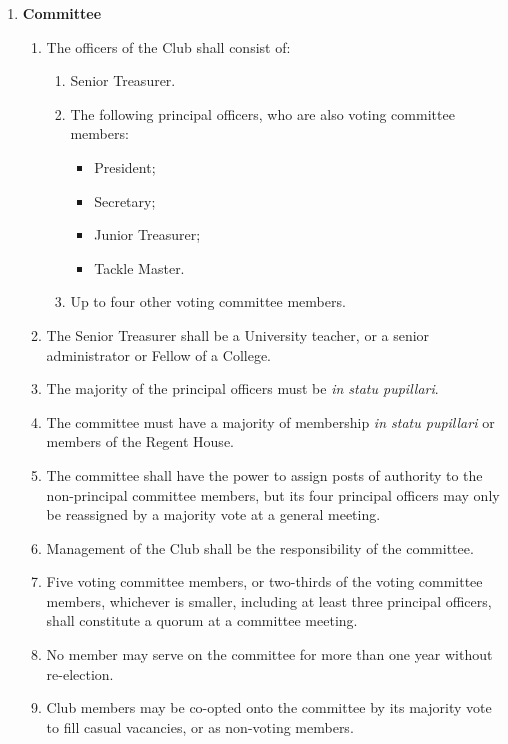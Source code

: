 \documentclass[a4paper,11pt]{article}
\begin{document}
\begin{enumerate}
\item {\bf Committee}

\begin{enumerate}
\item The officers of the Club shall consist of:
\label{officers}
\begin{enumerate}
\item Senior Treasurer.

\item The following principal officers, who are also voting committee members:
\begin{itemize}
\item President;
\item Secretary;
\item Junior Treasurer;
\item Tackle Master.
\end{itemize}

\item Up to four other voting committee members.
\end{enumerate}

\item The Senior Treasurer shall be a University teacher, or a senior
administrator or Fellow of a College.

\item The majority of the principal officers must be {\em in statu pupillari}.

\item The committee must have a majority of membership {\em in statu pupillari} or
members of the Regent House.

\item The committee shall have the power to assign posts of authority to the
non-principal committee members, but its four principal officers may only be
reassigned by a majority vote at a general meeting. 

\item Management of the Club shall be the responsibility of the committee. 

\item Five voting committee members, or two-thirds of the voting committee
members, whichever is smaller, including at least three principal officers,
shall constitute a quorum at a committee meeting. 

\item No member may serve on the committee for more than one year without
re-election. 

\item Club members may be co-opted onto the committee by its majority vote to
fill casual vacancies, or as non-voting members. 


\end{enumerate}
\end{enumerate}
\end{document}
